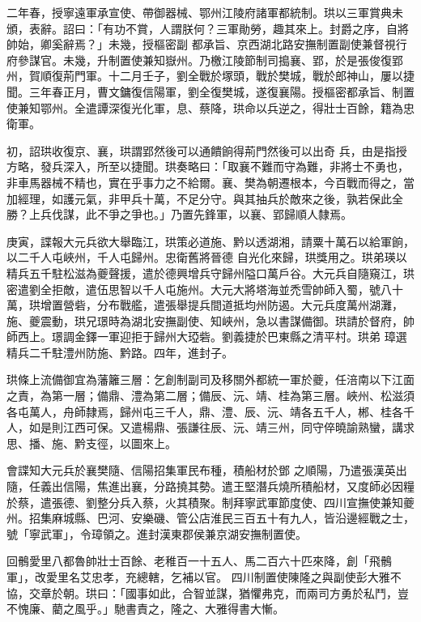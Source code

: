 \begin{pinyinscope}
 二年春，授寧遠軍承宣使、帶御器械、鄂州江陵府諸軍都統制。珙以三軍賞典未頒，表辭。詔曰：「有功不賞，人謂朕何？三軍勛勞，趣其來上。封爵之序，自將帥始，卿奚辭焉？」未幾，授樞密副
 都承旨、京西湖北路安撫制置副使兼督視行府參謀官。未幾，升制置使兼知嶽州。乃檄江陵節制司搗襄、郢，於是張俊復郢州，賀順復荊門軍。十二月壬子，劉全戰於塚頭，戰於樊城，戰於郎神山，屢以捷聞。三年春正月，曹文鏞復信陽軍，劉全復樊城，遂復襄陽。授樞密都承旨、制置使兼知鄂州。全遣譚深復光化軍，息、蔡降，珙命以兵逆之，得壯士百餘，籍為忠衛軍。



 初，詔珙收復京、襄，珙謂郢然後可以通饋餉得荊門然後可以出奇
 兵，由是指授方略，發兵深入，所至以捷聞。珙奏略曰：「取襄不難而守為難，非將士不勇也，非車馬器械不精也，實在乎事力之不給爾。襄、樊為朝遷根本，今百戰而得之，當加經理，如護元氣，非甲兵十萬，不足分守。與其抽兵於敵來之後，孰若保此全勝？上兵伐謀，此不爭之爭也。」乃置先鋒軍，以襄、郢歸順人隸焉。



 庚寅，諜報大元兵欲大舉臨江，珙策必道施、黔以透湖湘，請粟十萬石以給軍餉，以二千人屯峽州，千人屯歸州。忠衛舊將晉德
 自光化來歸，珙獎用之。珙弟瑛以精兵五千駐松滋為夔聲援，遣於德興增兵守歸州隘口萬戶谷。大元兵自隨窺江，珙密遣劉全拒敵，遣伍思智以千人屯施州。大元大將塔海並禿雪帥師入蜀，號八十萬，珙增置營砦，分布戰艦，遣張舉提兵間道抵均州防遏。大元兵度萬州湖灘，施、夔震動，珙兄璟時為湖北安撫副使、知峽州，急以書謀備御。珙請於督府，帥師西上。璟調金鐸一軍迎拒于歸州大𤦩砦。劉義捷於巴東縣之清平村。珙弟
 璋選精兵二千駐澧州防施、黔路。四年，進封子。



 珙條上流備御宜為藩籬三層：乞創制副司及移關外都統一軍於夔，任涪南以下江面之責，為第一層；備鼎、澧為第二層；備辰、沅、靖、桂為第三層。峽州、松滋須各屯萬人，舟師隸焉，歸州屯三千人，鼎、澧、辰、沅、靖各五千人，郴、桂各千人，如是則江西可保。又遣楊鼎、張謙往辰、沅、靖三州，同守倅曉諭熟蠻，講求思、播、施、黔支徑，以圖來上。



 會諜知大元兵於襄樊隨、信陽招集軍民布種，積船材於鄧
 之順陽，乃遣張漢英出隨，任義出信陽，焦進出襄，分路撓其勢。遣王堅潛兵燒所積船材，又度師必因糧於蔡，遣張德、劉整分兵入蔡，火其積聚。制拜寧武軍節度使、四川宣撫使兼知夔州。招集麻城縣、巴河、安樂磯、管公店淮民三百五十有九人，皆沿邊經戰之士，號「寧武軍」，令璋領之。進封漢東郡侯兼京湖安撫制置使。



 回鶻愛里八都魯帥壯士百餘、老稚百一十五人、馬二百六十匹來降，創「飛鶻軍」，改愛里名艾忠孝，充總轄，乞補以官。
 四川制置使陳隆之與副使彭大雅不協，交章於朝。珙曰：「國事如此，合智並謀，猶懼弗克，而兩司方勇於私鬥，豈不愧廉、藺之風乎。」馳書責之，隆之、大雅得書大慚。




\end{pinyinscope}
